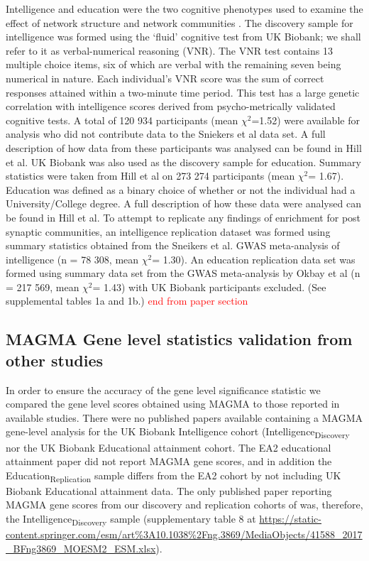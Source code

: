 Intelligence and education were the two cognitive phenotypes used to examine the effect of network structure and network communities . The discovery sample for intelligence was formed using the ‘fluid’ cognitive test from UK Biobank; we shall refer to it as verbal-numerical reasoning (VNR). The VNR test contains 13 multiple choice items, six of which are verbal with the remaining seven being numerical in nature. Each individual’s VNR score was the sum of correct responses attained within a two-minute time period. This test has a large genetic correlation with intelligence scores derived from psycho-metrically validated cognitive tests. A total of 120 934 participants (mean $\chi^2$=1.52) were available for analysis who did not contribute data to the Sniekers et al data set. A full description of how data from these participants was analysed can be found in Hill et al. \cite{hill2019combined} 
UK Biobank was also used as the discovery sample for education. Summary statistics were taken from Hill et al on 273 274 participants (mean  $\chi^2$= 1.67). \cite{hill2019combined}  Education was defined as a binary choice of whether or not the individual had a University/College degree. A full description of how these data were analysed can be found in Hill et al. \cite{hill2019combined}  
To attempt to replicate any findings of enrichment for post synaptic communities, an intelligence replication dataset was formed using summary statistics obtained from the Sneikers et al. GWAS meta-analysis of intelligence (n = 78 308, mean $\chi^2$= 1.30).  \cite{sniekers2017genome}  An education replication data set was formed using summary data set from the GWAS meta-analysis by Okbay et al (n = 217 569, mean $\chi^2$= 1.43) with UK Biobank participants excluded. \cite{okbay2016genome}  (See supplemental tables 1a and 1b.)
\textcolor{red}{end from paper section} 

 
\subsection{MAGMA Gene level statistics validation from other studies}

In order to ensure the accuracy of the gene level significance statistic we compared the gene level scores obtained using MAGMA to those reported in available studies.\cite{de2015magma} There were no published papers available containing a MAGMA gene-level analysis for the UK Biobank Intelligence cohort (Intelligence\textsubscript{Discovery} nor the UK Biobank Educational attainment cohort. The EA2 \cite{okbay2016genome} educational attainment paper did not report MAGMA gene scores, and in addition the Education\textsubscript{Replication} sample differs from the EA2 cohort by not including UK Biobank Educational attainment data. The only published paper reporting MAGMA gene scores from our discovery and replication cohorts of was, therefore, the Intelligence\textsubscript{Discovery} sample \cite{sniekers2017genome} (supplementary table 8 at \url{https://static-content.springer.com/esm/art\%3A10.1038\%2Fng.3869/MediaObjects/41588_2017_BFng3869_MOESM2_ESM.xlsx}).


